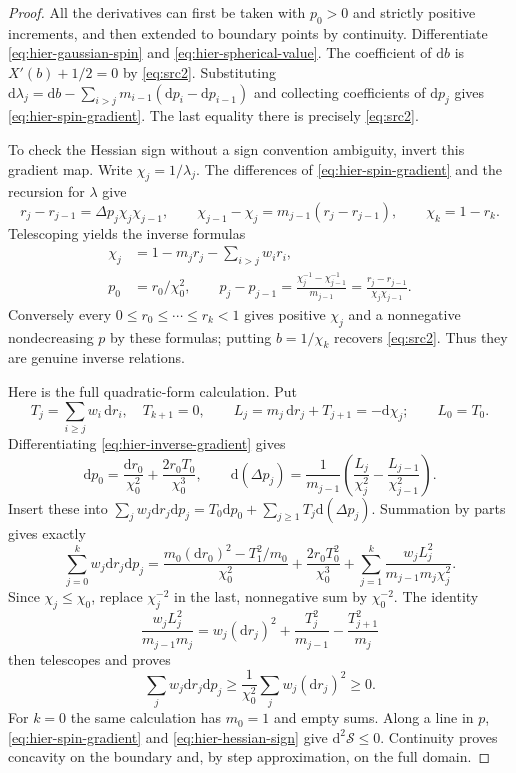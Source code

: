 \documentclass[11pt,a4paper]{article}
\numberwithin{equation}{section}
\theoremstyle{definition}
\theoremstyle{remark}
\newcommand{\dd}{\mathrm d}
\begin{document}
\begin{proof}
All the derivatives can first be taken with $p_0>0$ and strictly positive
increments, and then extended to boundary points by continuity.
Differentiate \eqref{eq:hier-gaussian-spin} and
\eqref{eq:hier-spherical-value}.  The coefficient of $\dd b$ is
$X'(b)+1/2=0$ by \eqref{eq:src2}.  Substituting
$\dd\lambda_j=\dd b-\sum_{i>j}m_{i-1}(\dd p_i-\dd p_{i-1})$
and collecting coefficients of $\dd p_j$ gives
\eqref{eq:hier-spin-gradient}.  The last equality there is precisely
\eqref{eq:src2}.

To check the Hessian sign without a sign convention ambiguity, invert this
gradient map.  Write $\chi_j=1/\lambda_j$.  The differences of
\eqref{eq:hier-spin-gradient} and the recursion for $\lambda$ give
\[
 r_j-r_{j-1}=\Delta p_j\chi_j\chi_{j-1},\qquad
 \chi_{j-1}-\chi_j=m_{j-1}(r_j-r_{j-1}),\qquad
 \chi_k=1-r_k.
\]
Telescoping yields the inverse formulas
\begin{equation}
 \begin{split}
 \chi_j&=1-m_jr_j-\sum_{i>j}w_ir_i,\\
 p_0&=r_0/\chi_0^2,\qquad
 p_j-p_{j-1}
 =\frac{\chi_j^{-1}-\chi_{j-1}^{-1}}{m_{j-1}}
 =\frac{r_j-r_{j-1}}{\chi_j\chi_{j-1}}.
 \end{split}
 \label{eq:hier-inverse-gradient}
\end{equation}
Conversely every $0\le r_0\le\cdots\le r_k<1$ gives positive $\chi_j$ and a
nonnegative nondecreasing $p$ by these formulas; putting $b=1/\chi_k$
recovers \eqref{eq:src2}.  Thus they are genuine inverse relations.

Here is the full quadratic-form calculation.  Put
\[
 T_j=\sum_{i\ge j}w_i\,\dd r_i,\quad T_{k+1}=0,
 \qquad L_j=m_j\,\dd r_j+T_{j+1}=-\dd\chi_j;
 \qquad L_0=T_0.
\]
Differentiating \eqref{eq:hier-inverse-gradient} gives
\[
 \dd p_0=\frac{\dd r_0}{\chi_0^2}
                  +\frac{2r_0T_0}{\chi_0^3},\qquad
 \dd(\Delta p_j)=\frac1{m_{j-1}}
 \left(\frac{L_j}{\chi_j^2}-\frac{L_{j-1}}{\chi_{j-1}^2}\right).
\]
Insert these into
$\sum_jw_j\dd r_j\dd p_j=T_0\dd p_0+\sum_{j\ge1}T_j\dd(\Delta p_j)$.
Summation by parts gives exactly
\begin{equation}
 \sum_{j=0}^k w_j\dd r_j\dd p_j
 =\frac{m_0(\dd r_0)^2-T_1^2/m_0}{\chi_0^2}
  +\frac{2r_0T_0^2}{\chi_0^3}
  +\sum_{j=1}^k\frac{w_jL_j^2}{m_{j-1}m_j\chi_j^2}.
 \label{eq:hier-positive-form}
\end{equation}
Since $\chi_j\le\chi_0$, replace $\chi_j^{-2}$ in the last, nonnegative
sum by $\chi_0^{-2}$.  The identity
\[
 \frac{w_jL_j^2}{m_{j-1}m_j}
 =w_j(\dd r_j)^2+\frac{T_j^2}{m_{j-1}}-\frac{T_{j+1}^2}{m_j}
\]
then telescopes and proves
\begin{equation}
 \sum_jw_j\dd r_j\dd p_j
 \ge\frac1{\chi_0^2}\sum_jw_j(\dd r_j)^2\ge0.
 \label{eq:hier-hessian-sign}
\end{equation}
For $k=0$ the same calculation has $m_0=1$ and empty sums.
Along a line in $p$, \eqref{eq:hier-spin-gradient} and
\eqref{eq:hier-hessian-sign} give $\dd^2\mathcal S\le0$.
Continuity proves concavity on the boundary and, by step approximation,
on the full domain.


\end{proof}
\end{document}
